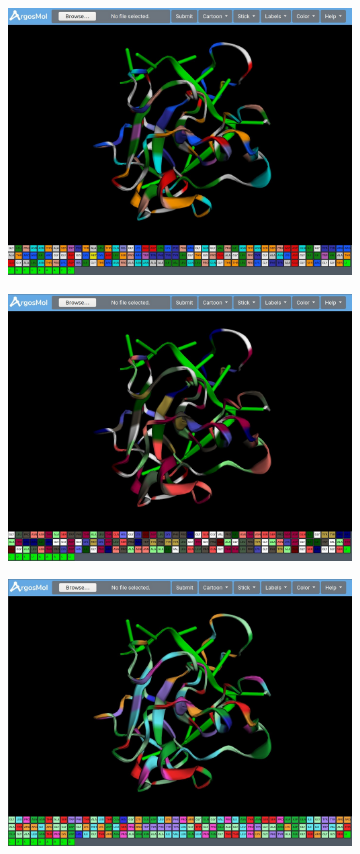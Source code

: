 \documentclass{article}
\begin{document}
\begin{figure}[H]
\begin{subfigure}{.5\textwidth}
		\caption{}
		\label{fig:sfig1}
	\end{subfigure}%
	\begin{subfigure}{.5\textwidth}
		\centering
		\includegraphics[width=.8\linewidth]{img/argosmol/mol9}
		\caption{}
		\label{fig:sfig2}
	\end{subfigure}
	\begin{subfigure}{.5\textwidth}
		\centering
		\includegraphics[width=.8\linewidth]{img/argosmol/mol10}
		\caption{}
		\label{fig:sfig1}
	\end{subfigure}%
	\begin{subfigure}{.5\textwidth}
		\centering
		\includegraphics[width=.8\linewidth]{img/argosmol/mol11}

\end{subfigure}
\end{figure}
\end{document}
